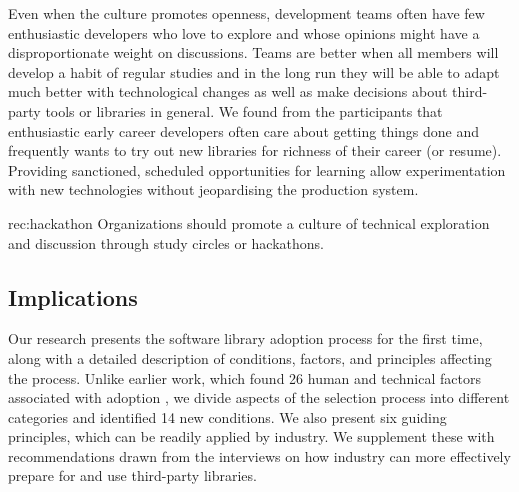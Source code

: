  Even when the culture promotes openness, development teams often have few enthusiastic developers who love to explore and whose opinions might have a disproportionate weight on discussions. Teams are better when all members will develop a habit of regular studies and in the long run they will be able to adapt much better with technological changes as well as make decisions about third-party tools or libraries in general. We found from the participants that enthusiastic early career developers often care about getting things done and frequently wants to try out new libraries for richness of their career (or resume). %
 Providing sanctioned, scheduled opportunities for learning allow experimentation with new technologies without jeopardising the production system.
  \begin{recommendation}{rec:hackathon}
  Organizations should promote a culture of technical exploration and discussion through study circles or hackathons.
\end{recommendation}


\subsection{Implications} 
Our research presents the software library adoption process for the first time, along with a detailed description of conditions, factors, and principles affecting the process. Unlike earlier work, which found 26 human and technical factors associated with adoption \cite{larios2020selecting}, we divide aspects of the selection process into different categories and identified 14 new conditions. 
We also present six guiding principles, which can be readily applied by industry. We supplement these with recommendations drawn from the interviews on how industry can more effectively prepare for and use third-party libraries. 


